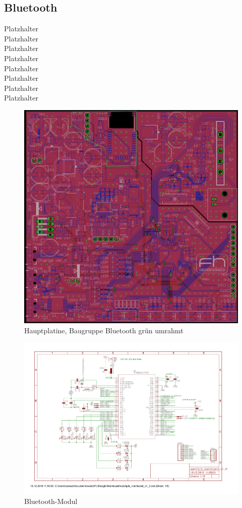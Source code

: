 \documentclass[a4paper]{scrartcl}
\begin{document}
\subsection{Bluetooth}

Platzhalter\\Platzhalter\\Platzhalter\\Platzhalter\\Platzhalter\\Platzhalter\\
Platzhalter\\Platzhalter

\begin{figure}[H]\centering
\includegraphics[page=1, angle=0, width=\linewidth]{../Documentation/pics/mainboard_bluetooth.png}
\caption{Hauptplatine, Baugruppe Bluetooth grün umrahmt}
\end{figure}

\begin{figure}[H]\centering
\includegraphics[page=4, angle=90, width=\linewidth]{../eagle/Mainboard/watchplb_mainboard_v1_0.pdf}
\caption{Bluetooth-Modul}
\end{figure}
\end{document}
